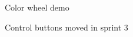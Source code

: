 \documentclass[11pt]{article} %
\begin{document}
{  \begin{figure}[H]
  	\centering
  	\caption{Color wheel demo}
  	\label{fig:GUI Design 3 demo}
  \end{figure}
  
  \begin{figure}[H]
  	\centering
  	\caption{Control buttons moved in sprint 3}
  	\label{fig:GUI Design 4}
  \end{figure}
  
}
\end{document}
